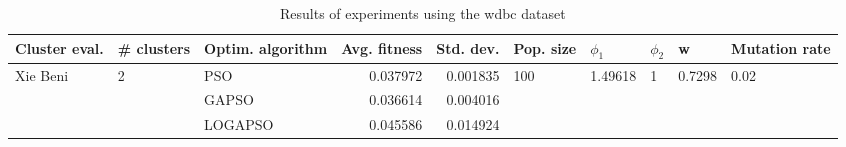 \begin{table}
\centering
\caption{Results of experiments using the wdbc dataset}
\begin{tabular}{lllrrlllll}
\toprule
            Cluster eval. &        \# clusters & Optim. algorithm &  Avg. fitness &  Std. dev. &            Pop. size &               $\phi_{1}$ &         $\phi_{2}$ &                       w &         Mutation rate \\
\midrule
\multirow{3}{*}{Xie Beni} & \multirow{3}{*}{2} &              PSO &      0.037972 &   0.001835 & \multirow{3}{*}{100} & \multirow{3}{*}{1.49618} & \multirow{3}{*}{1} & \multirow{3}{*}{0.7298} & \multirow{3}{*}{0.02} \\
                          &                    &            GAPSO &      0.036614 &   0.004016 &                      &                          &                    &                         &                       \\
                          &                    &          LOGAPSO &      0.045586 &   0.014924 &                      &                          &                    &                         &                       \\
\bottomrule
\end{tabular}
\end{table}
